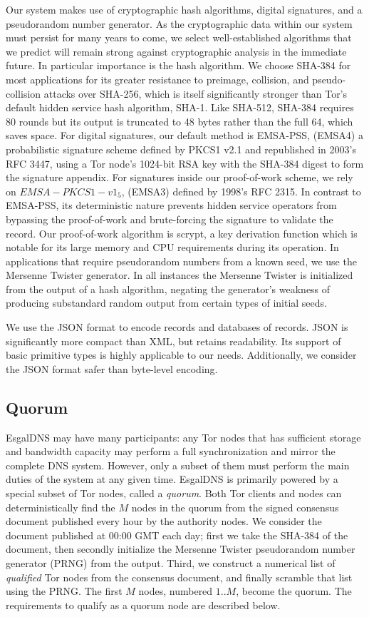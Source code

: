 Our system makes use of cryptographic hash algorithms, digital signatures, and a pseudorandom number generator. As the cryptographic data within our system must persist for many years to come, we select well-established algorithms that we predict will remain strong against cryptographic analysis in the immediate future. In particular importance is the hash algorithm. We choose SHA-384 for most applications for its greater resistance to preimage, collision, and pseudo-collision attacks over SHA-256, which is itself significantly stronger than Tor's default hidden service hash algorithm, SHA-1. Like SHA-512, SHA-384 requires 80 rounds but its output is truncated to 48 bytes rather than the full 64, which saves space. For digital signatures, our default method is EMSA-PSS, (EMSA4) a probabilistic signature scheme defined by PKCS1 v2.1 and republished in 2003's RFC 3447, using a Tor node's 1024-bit RSA key with the SHA-384 digest to form the signature appendix. For signatures inside our proof-of-work scheme, we rely on $EMSA-PKCS1-v1_5$, (EMSA3) defined by 1998's RFC 2315. In contrast to EMSA-PSS, its deterministic nature prevents hidden service operators from bypassing the proof-of-work and brute-forcing the signature to validate the record. Our proof-of-work algorithm is scrypt, a key derivation function which is notable for its large memory and CPU requirements during its operation. In applications that require pseudorandom numbers from a known seed, we use the Mersenne Twister generator. In all instances the Mersenne Twister is initialized from the output of a hash algorithm, negating the generator's weakness of producing substandard random output from certain types of initial seeds.

We use the JSON format to encode records and databases of records. JSON is significantly more compact than XML, but retains readability. Its support of basic primitive types is highly applicable to our needs. Additionally, we consider the JSON format safer than byte-level encoding.

\subsection{Quorum}

EsgalDNS may have many participants: any Tor nodes that has sufficient storage and bandwidth capacity may perform a full synchronization and mirror the complete DNS system. However, only a subset of them must perform the main duties of the system at any given time. EsgalDNS is primarily powered by a special subset of Tor nodes, called a \textit{quorum}. Both Tor clients and nodes can deterministically find the $ M $ nodes in the quorum from the signed consensus document published every hour by the authority nodes. We consider the document published at 00:00 GMT each day; first we take the SHA-384 of the document, then secondly initialize the Mersenne Twister pseudorandom number generator (PRNG) from the output. Third, we construct a numerical list of \textit{qualified} Tor nodes from the consensus document, and finally scramble that list using the PRNG. The first $ M $ nodes, numbered $ 1 .. M $, become the quorum. The requirements to qualify as a quorum node are described below.

